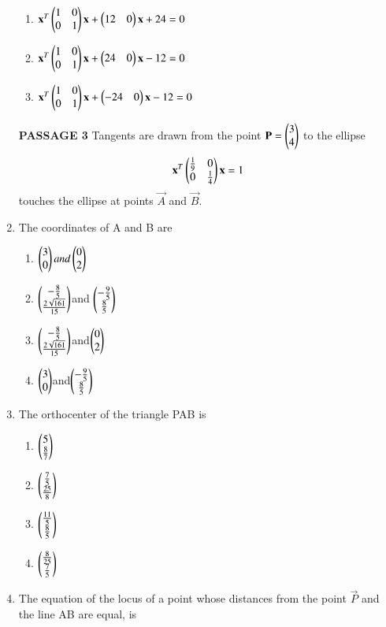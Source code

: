 \documentclass[journal,12pt,twocolumn]{IEEEtran}
\begin{document}
\begin{enumerate}[label=\arabic*]
\begin{enumerate}
    \item $\mathbf{x}^T\begin{pmatrix}1&0\\0&1\end{pmatrix}\mathbf{x}+\begin{pmatrix}12&0\end{pmatrix}\mathbf{x}+24=0$
    \item $\mathbf{x}^T\begin{pmatrix}1&0\\0&1\end{pmatrix}\mathbf{x}+\begin{pmatrix}24&0\end{pmatrix}\mathbf{x}-12=0$
    \item $\mathbf{x}^T\begin{pmatrix}1&0\\0&1\end{pmatrix}\mathbf{x}+\begin{pmatrix}-24&0\end{pmatrix}\mathbf{x}-12=0$
    \end{enumerate}
    \textbf{PASSAGE 3}
    Tangents are drawn from the point $\mathbf{P}=\begin{pmatrix}3\\4\end{pmatrix}$ to the ellipse
    \begin{align}
    \mathbf{x}^T\begin{pmatrix}\frac{1}{9}&0\\0&\frac{1}{4}\end{pmatrix}\mathbf{x}=1
    \end{align} touches the ellipse at points $\vec{A}$ and $\vec{B}$.
    \item The coordinates of A and B are 
    \begin{enumerate}
    \item $\begin{pmatrix}3\\0\end{pmatrix}and\begin{pmatrix}0\\2\end{pmatrix}$
    \item $\begin{pmatrix}-\frac{8}{5}\\\frac{2\sqrt{161}}{15}\end{pmatrix}$and
    $\begin{pmatrix}-\frac{9}{5} \\\frac{8}{5}\end{pmatrix}$
    \item $\begin{pmatrix}-\frac{8}{5}\\\frac{2\sqrt{161}}{15}\end{pmatrix}$and$\begin{pmatrix}0\\2\end{pmatrix}$
    \item $\begin{pmatrix}3\\0\end{pmatrix}$and$\begin{pmatrix}-\frac{9}{5}\\\frac{8}{5}\end{pmatrix}$
    \end{enumerate}
    \item The orthocenter of the triangle PAB is 
    \begin{enumerate}
    \item $\begin{pmatrix}5\\\frac{8}{7}\end{pmatrix}$
    \item $\begin{pmatrix}\frac{7}{5}\\\frac{25}{8}\end{pmatrix}$
    \item $\begin{pmatrix}\frac{11}{5}\\\frac{8}{5}\end{pmatrix}$
    \item $\begin{pmatrix}\frac{8}{25}\\\frac{7}{5}\end{pmatrix}$
    \end{enumerate}
    \item The equation of the locus of a point whose distances from the point $\vec{P}$ and the line 		AB are equal, is 

\end{enumerate}
\end{document}
